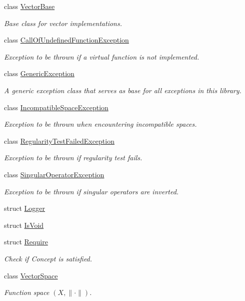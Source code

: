 \begin{DoxyCompactItemize}
\item 
class \hyperlink{classSpacy_1_1VectorBase}{\-Vector\-Base}
\begin{DoxyCompactList}\small\item\em \-Base class for vector implementations. \end{DoxyCompactList}\item 
class \hyperlink{classSpacy_1_1CallOfUndefinedFunctionException}{\-Call\-Of\-Undefined\-Function\-Exception}
\begin{DoxyCompactList}\small\item\em \-Exception to be thrown if a virtual function is not implemented. \end{DoxyCompactList}\item 
class \hyperlink{classSpacy_1_1GenericException}{\-Generic\-Exception}
\begin{DoxyCompactList}\small\item\em \-A generic exception class that serves as base for all exceptions in this library. \end{DoxyCompactList}\item 
class \hyperlink{classSpacy_1_1IncompatibleSpaceException}{\-Incompatible\-Space\-Exception}
\begin{DoxyCompactList}\small\item\em \-Exception to be thrown when encountering incompatible spaces. \end{DoxyCompactList}\item 
class \hyperlink{classSpacy_1_1RegularityTestFailedException}{\-Regularity\-Test\-Failed\-Exception}
\begin{DoxyCompactList}\small\item\em \-Exception to be thrown if regularity test fails. \end{DoxyCompactList}\item 
class \hyperlink{classSpacy_1_1SingularOperatorException}{\-Singular\-Operator\-Exception}
\begin{DoxyCompactList}\small\item\em \-Exception to be thrown if singular operators are inverted. \end{DoxyCompactList}\item 
struct \hyperlink{structSpacy_1_1Logger}{\-Logger}
\item 
struct \hyperlink{structSpacy_1_1IsVoid}{\-Is\-Void}
\item 
struct \hyperlink{structSpacy_1_1Require}{\-Require}
\begin{DoxyCompactList}\small\item\em \-Check if \-Concept is satisfied. \end{DoxyCompactList}\item 
class \hyperlink{classSpacy_1_1VectorSpace}{\-Vector\-Space}
\begin{DoxyCompactList}\small\item\em \-Function space $(X,\|\cdot\|)$. \end{DoxyCompactList}\end{DoxyCompactItemize}
